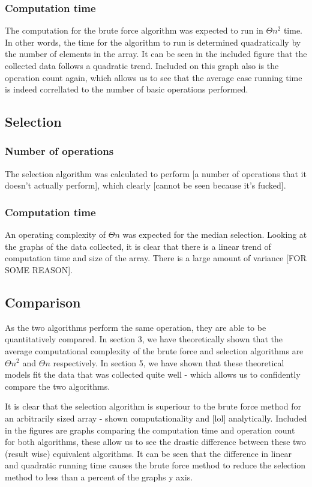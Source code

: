 \documentclass{article}
\begin{document}
        \subsubsection{Computation time}
            The computation for the brute force algorithm was expected to run in $\Theta{n^2}$ time. In other words, the time for the algorithm to run is determined quadratically by the number of elements in the array. It can be seen in the included figure that the collected data follows a quadratic trend. Included on this graph also is the operation count again, which allows us to see that the average case running time is indeed correllated to the number of basic operations performed.
    \subsection{Selection}
        \subsubsection{Number of operations}
            The selection algorithm was calculated to perform [a number of operations that it doesn't actually perform], which clearly [cannot be seen because it's fucked].
        \subsubsection{Computation time}
            An operating complexity of $\Theta{n}$ was expected for the median selection. Looking at the graphs of the data collected, it is clear that there is a linear trend of computation time and size of the array. There is a large amount of variance [FOR SOME REASON].
    \subsection{Comparison}
        As the two algorithms perform the same operation, they are able to be quantitatively compared. In section 3, we have theoretically shown that the average computational complexity of the brute force and selection algorithms are $\Theta{n^2}$ and $\Theta{n}$ respectively. In section 5, we have shown that these theoretical models fit the data that was collected quite well - which allows us to confidently compare the two algorithms.

        It is clear that the selection algorithm is superiour to the brute force method for an arbitrarily sized array - shown computationality and [lol] analytically. Included in the figures are graphs comparing the computation time and operation count for both algorithms, these allow us to see the drastic difference between these two (result wise) equivalent algorithms. It can be seen that the difference in linear and quadratic running time causes the brute force method to reduce the selection method to less than a percent of the graphs y axis.
\end{document}
